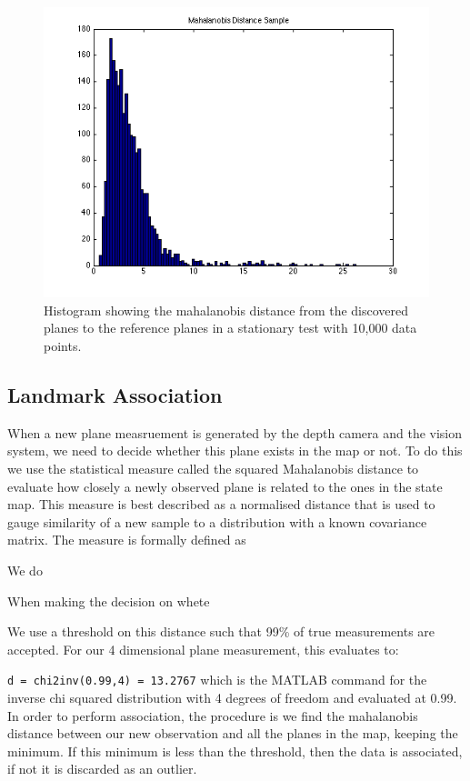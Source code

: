 \documentclass[]{article}
\begin{document}
{%

\begin{figure}[tb]
	\begin{center}
		\includegraphics[height = 0.3\textwidth]{malhala_hist_100bins_10000datapoints_notmoving22}
	\end{center}
	\caption{Histogram showing the mahalanobis distance from the discovered planes to the reference planes in a stationary test with 10,000 data points.}
	\label{fig:mahaldisthist}
\end{figure}

\subsection{Landmark Association} %
\label{sub:landmark_association}
When a new plane measruement is generated by the depth camera and the vision system, we need to decide whether this plane exists in the map or not. To do this we use the statistical measure called the squared Mahalanobis distance to evaluate how closely a newly observed plane is related to the ones in the state map. This measure is best described as a normalised distance that is used to gauge similarity of a new sample to a distribution with a known covariance matrix. The measure is formally defined as


We do 

When making the decision on whete

We use a threshold on this distance such that 99\% of true measurements are accepted. For our 4 dimensional plane measurement, this evaluates to:

\verb"d = chi2inv(0.99,4) = 13.2767" which is the MATLAB command for the inverse chi squared distribution with 4 degrees of freedom and evaluated at 0.99. In order to perform association, the procedure is we find the mahalanobis distance between our new observation and all the planes in the map, keeping the minimum. If this minimum is less than the threshold, then the data is associated, if not it is discarded as an outlier.

}
\end{document}
